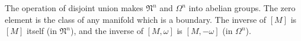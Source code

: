 The operation of disjoint union makes $\mathfrak{N}^n$ and $\Omega^n$ into abelian groups. The zero element is the class of any manifold which is a boundary. The inverse of $[M]$ is $[M]$ itself (in $\mathfrak{N}^n$), and the inverse of $[M, \omega]$ is $[M, -\omega]$ (in $\Omega^n$).
